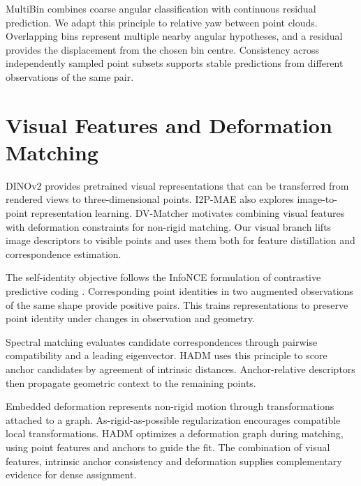MultiBin \citep{Mousavian_2017_MultiBin} combines coarse angular classification with continuous residual prediction. We adapt this principle to relative yaw between point clouds. Overlapping bins represent multiple nearby angular hypotheses, and a residual provides the displacement from the chosen bin centre. Consistency across independently sampled point subsets supports stable predictions from different observations of the same pair.

\section{Visual Features and Deformation Matching}
DINOv2 \citep{oquab2024dinov2learningrobustvisual} provides pretrained visual representations that can be transferred from rendered views to three-dimensional points. I2P-MAE \citep{Zhang_2023_CVPR} also explores image-to-point representation learning. DV-Matcher \citep{Chen_2025_CVPR} motivates combining visual features with deformation constraints for non-rigid matching. Our visual branch lifts image descriptors to visible points and uses them both for feature distillation and correspondence estimation.

The self-identity objective follows the InfoNCE formulation of contrastive predictive coding \citep{Oord_2018_CPC}. Corresponding point identities in two augmented observations of the same shape provide positive pairs. This trains representations to preserve point identity under changes in observation and geometry.

Spectral matching \citep{Leordeanu_2005_Spectral} evaluates candidate correspondences through pairwise compatibility and a leading eigenvector. HADM uses this principle to score anchor candidates by agreement of intrinsic distances. Anchor-relative descriptors then propagate geometric context to the remaining points.

Embedded deformation \citep{10.1145/1275808.1276478} represents non-rigid motion through transformations attached to a graph. As-rigid-as-possible regularization \citep{sorkine2007rigid} encourages compatible local transformations. HADM optimizes a deformation graph during matching, using point features and anchors to guide the fit. The combination of visual features, intrinsic anchor consistency and deformation supplies complementary evidence for dense assignment.

